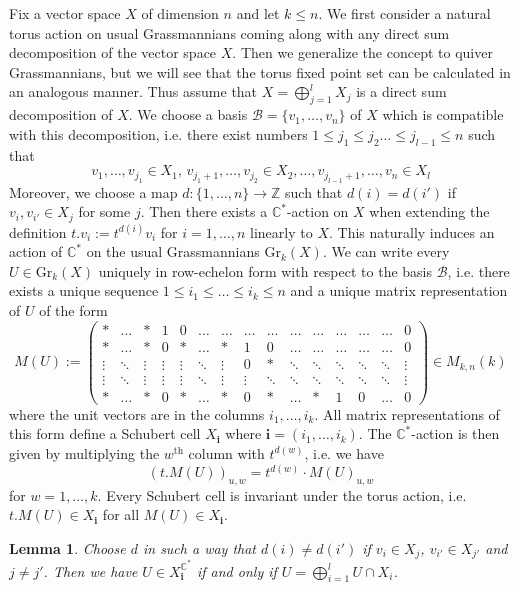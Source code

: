 \documentclass{amsart}
\newtheorem{lemma}[theorem]{Lemma}
\newcommand{\bfi}{\mathbf{i}}
\newcommand{\C}{\mathbb{C}}
\newcommand{\Gr}{\mathrm{Gr}}
\begin{document}
Fix a vector space $X$ of dimension $n$ and let $k\leq n$. We first consider a natural torus action on usual Grassmannians coming along with any direct sum decomposition of the vector space $X$. Then we generalize the concept to quiver Grassmannians, but we will see that the torus fixed point set can be calculated in an analogous manner. Thus assume that $X=\bigoplus_{j=1}^l X_j$ is a direct sum decomposition of $X$. We choose a basis $\mathcal B=\{v_1,\ldots,v_n\}$ of $X$ which is compatible with this decomposition, i.e. there exist numbers $1\leq j_1\leq j_2\ldots\leq j_{l-1}\leq n$ such that
\[v_1,\ldots,v_{j_1}\in X_1,\,v_{j_1+1},\ldots,v_{j_2}\in X_2,\ldots,v_{j_{l-1}+1},\ldots,v_{n}\in X_l\]
Moreover, we choose a map $d:\{1,\ldots,n\}\to\mathbb{Z}$ such that $d(i)=d(i')$ if $v_i,v_{i'}\in X_{j}$ for some $j$. Then there exists a $\C^\ast$-action on $X$ when extending the definition $t.v_i:=t^{d(i)}v_i$ for $i=1,\ldots,n$ linearly to $X$. This naturally induces an action of $\C^\ast$ on the usual Grassmannians $\Gr_k(X)$. We can write every $U\in\Gr_k(X)$ uniquely in row-echelon form with respect to the basis $\mathcal B$, i.e. there exists a unique sequence $1\leq i_1\leq\ldots\leq i_k\leq n$ and a unique matrix representation of $U$ of the form
\[M(U):=\begin{pmatrix}\ast&\ldots &\ast &1&0 &\ldots&\ldots&\ldots&\ldots&\ldots&\ldots&\ldots&\ldots&\ldots&0\\\ast&\ldots &\ast&0&\ast&\ldots &\ast&1&0&\ldots&\ldots&\ldots&\ldots&\ldots&0\\\vdots &\ddots&\vdots&\vdots&\vdots &\ddots&\vdots&0&\ast&\ddots&\ddots&\ddots&\ddots&\ddots&\vdots\\\vdots &\ddots&\vdots&\vdots&\vdots &\ddots&\vdots&\vdots&\ddots&\ddots&\ddots&\ddots&\ddots&\ddots&\vdots\\\ast&\ldots &\ast&0&\ast&\ldots &\ast&0&\ast&\ldots&\ast&1&0&\ldots&0\end{pmatrix}\in M_{k,n}(k)\]
where the unit vectors are in the columns $i_1,\ldots,i_k$. All matrix representations of this form define a Schubert cell $X_{\bfi}$ where $\bfi=(i_1,\ldots,i_k)$. The $\C^\ast$-action is then given by multiplying the $w^{\mathrm{th}}$ column with $t^{d(w)}$, i.e. we have
\[(t.M(U))_{u,w}=t^{d(w)}\cdot M(U)_{u,w}\]
for $w=1,\ldots,k$. Every Schubert cell is invariant under the torus action, i.e. $t.M(U)\in X_\bfi$ for all $M(U)\in X_{\bfi}$. 
\begin{lemma}
  \label{usualGrass}
  Choose $d$ in such a way that $d(i)\neq d(i')$ if $v_i\in X_j$, $v_{i'}\in X_{j'}$ and $j\neq j'$.
  Then we have $U\in X_{\bfi}^{\C^\ast}$ if and only if $U=\bigoplus_{i=1}^l U\cap X_i$.
\end{lemma}
\end{document}
